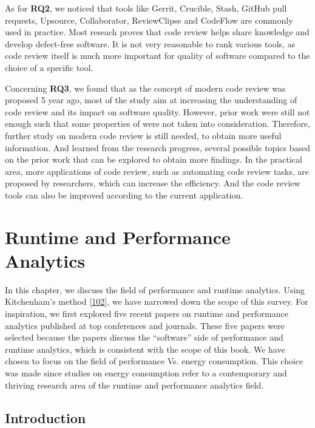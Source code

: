 \documentclass[]{book}
\begin{document}
As for \textbf{RQ2}, we noticed that tools like Gerrit, Crucible, Stash,
GitHub pull requests, Upsource, Collaborator, ReviewClipse and CodeFlow
are commonly used in practice. Most reseach proves that code review
helps share knowledge and develop defect-free software. It is not very
reasonable to rank various tools, as code review itself is much more
important for quality of software compared to the choice of a specific
tool.

Concerning \textbf{RQ3}, we found that as the concept of modern code
review was proposed 5 year ago, most of the study aim at increasing the
understanding of code review and its impact on software quality.
However, prior work were still not enough such that some properties of
were not taken into consideration. Therefore, further study on modern
code review is still needed, to obtain more useful information. And
learned from the research progress, several possible topics based on the
prior work that can be explored to obtain more findings. In the
practical area, more applications of code review, such as automating
code review tasks, are proposed by researchers, which can increase the
efficiency. And the code review tools can also be improved according to
the current application.

\chapter{Runtime and Performance
Analytics}\label{runtime-and-performance-analytics}

In this chapter, we discuss the field of performance and runtime
analytics. Using Kitchenham's method
{[}\protect\hyperlink{ref-kitchenham2004procedures}{102}{]}, we have
narrowed down the scope of this survey. For inspiration, we first
explored five recent papers on runtime and performance analytics
published at top conferences and journals. These five papers were
selected because the papers discuss the ``software'' side of performance
and runtime analytics, which is consistent with the scope of this book.
We have chosen to focus on the field of performance Vs. energy
consumption. This choice was made since studies on energy consumption
refer to a contemporary and thriving research area of the runtime and
performance analytics field.

\section{Introduction}\label{introduction-1}
\end{document}

